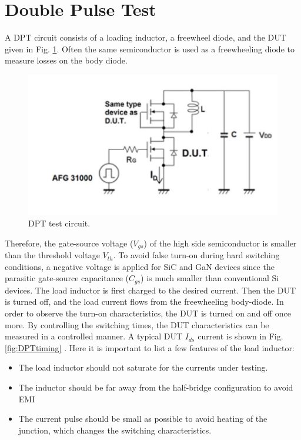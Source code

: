 \documentclass[12pt]{article} %
\begin{document}
\section{Double Pulse Test}

A DPT circuit consists of a loading inductor, a freewheel diode, and the DUT given in Fig. \ref{fig:DPTcircuit}. Often the same semiconductor is used as a freewheeling diode to measure losses on the body diode. 

\begin{figure}[h!]
	\includegraphics[scale=0.7]{figures/D_P_T.JPG}
	\caption{DPT test circuit.}
	\label{fig:DPTcircuit}
\end{figure}

Therefore, the gate-source voltage ($V_{gs}$) of the high side semiconductor is smaller than the threshold voltage $V_{th}$. To avoid false turn-on during hard switching conditions, a negative voltage is applied for SiC and GaN devices since the parasitic gate-source capacitance ($C_{gs}$) is much smaller than conventional Si devices. The load inductor is first charged to the desired current. Then the DUT is turned off, and the load current flows from the freewheeling body-diode. In order to observe the turn-on characteristics, the DUT is turned on and off once more. By controlling the switching times, the DUT characteristics can be measured in a controlled manner. A typical DUT $I_{ds}$ current is shown in Fig. \ref{fig:DPTtiming} \cite{Infineon}.  Here it is important to list a few features of the load inductor:

\begin{itemize}
    \item The load inductor should not saturate for the currents under testing.
    \item The inductor should be far away from the half-bridge configuration to avoid EMI
    \item The current pulse should be small as possible to avoid heating of the junction, which changes the switching characteristics.
\end{itemize}
\end{document}
